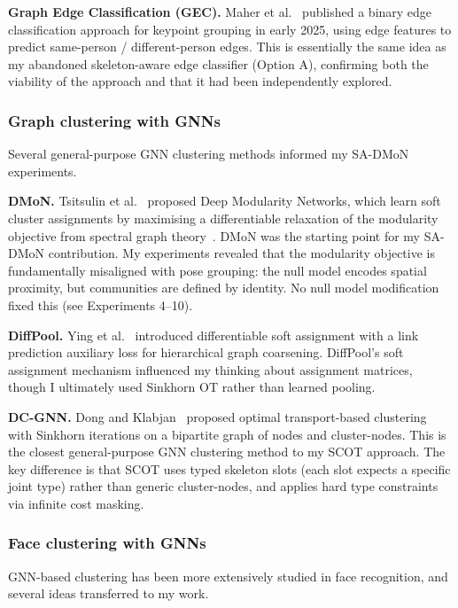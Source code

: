 \textbf{Graph Edge Classification (GEC).} Maher et al.~\cite{maher2025gec} published a binary edge classification approach for keypoint grouping in early 2025, using edge features to predict same-person / different-person edges. This is essentially the same idea as my abandoned skeleton-aware edge classifier (Option A), confirming both the viability of the approach and that it had been independently explored.

\subsubsection{Graph clustering with GNNs}

Several general-purpose GNN clustering methods informed my SA-DMoN experiments.

\textbf{DMoN.} Tsitsulin et al.~\cite{tsitsulin2023dmon} proposed Deep Modularity Networks, which learn soft cluster assignments by maximising a differentiable relaxation of the modularity objective from spectral graph theory~\cite{vonluxburg2007spectral}. DMoN was the starting point for my SA-DMoN contribution. My experiments revealed that the modularity objective is fundamentally misaligned with pose grouping: the null model encodes spatial proximity, but communities are defined by identity. No null model modification fixed this (see Experiments 4--10).

\textbf{DiffPool.} Ying et al.~\cite{ying2018diffpool} introduced differentiable soft assignment with a link prediction auxiliary loss for hierarchical graph coarsening. DiffPool's soft assignment mechanism influenced my thinking about assignment matrices, though I ultimately used Sinkhorn OT rather than learned pooling.

\textbf{DC-GNN.} Dong and Klabjan~\cite{dong2024dcgnn} proposed optimal transport-based clustering with Sinkhorn iterations on a bipartite graph of nodes and cluster-nodes. This is the closest general-purpose GNN clustering method to my SCOT approach. The key difference is that SCOT uses typed skeleton slots (each slot expects a specific joint type) rather than generic cluster-nodes, and applies hard type constraints via infinite cost masking.

\subsubsection{Face clustering with GNNs}

GNN-based clustering has been more extensively studied in face recognition, and several ideas transferred to my work.

